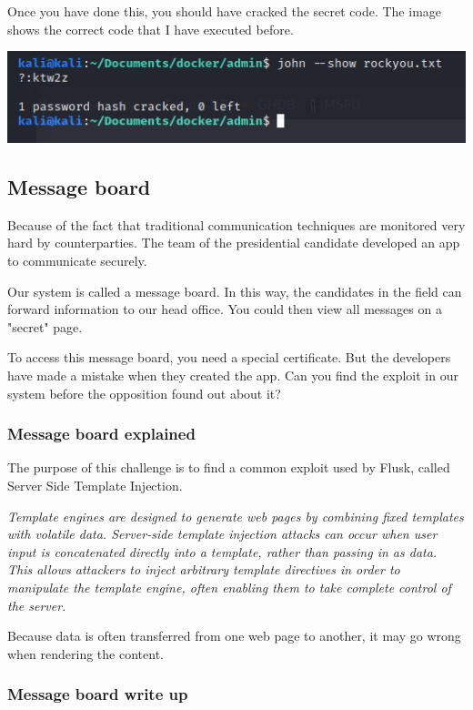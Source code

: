 \documentclass[../main.tex]{subfiles}
\begin{document}
Once you have done this, you should have cracked the secret code. The image shows the correct code that I have executed before. 

\includegraphics[width=\linewidth]{images/Boyan/challenge2_4_boyan.PNG}


\subsection{Message board}

Because of the fact that traditional communication techniques are monitored very hard by counterparties. The team of the presidential candidate developed an app to communicate securely. 

Our system is called a message board. In this way, the candidates in the field can forward information to our head office. You could then view all messages on a "secret" page.

To access this message board, you need a special certificate. But the developers have made a mistake when they created the app. Can you find the exploit in our system before the opposition found out about it?

\subsubsection{Message board explained}

The purpose of this challenge is to find a common exploit used by Flusk, called Server Side Template Injection.

\textit{Template engines are designed to generate web pages by combining fixed templates with volatile data. Server-side template injection attacks can occur when user input is concatenated directly into a template, rather than passing in as data. This allows attackers to inject arbitrary template directives in order to manipulate the template engine, often enabling them to take complete control of the server.}

Because data is often transferred from one web page to another, it may go wrong when rendering the content.

\subsubsection{Message board write up}
\end{document}
